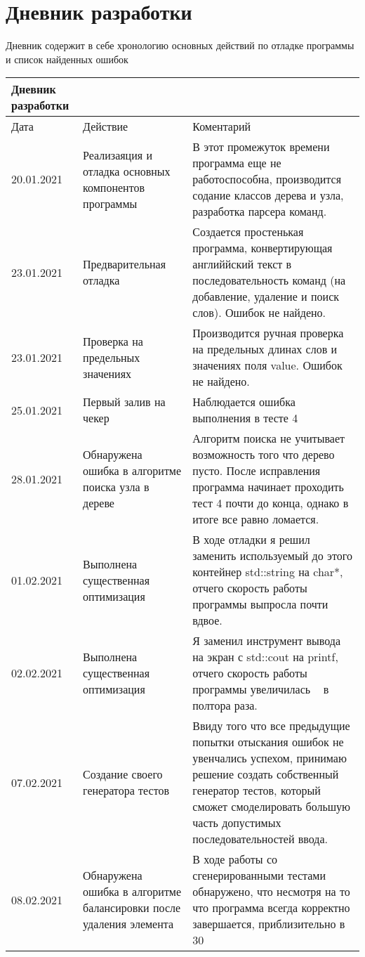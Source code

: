 \section{Дневник разработки}
Дневник содержит в себе хронологию основных действий по отладке программы и список найденных ошибок

\begin{longtable}{|p{5cm}|p{5cm}|p{5cm}|}
	\hline
	\rowcolor{lightgray}
	\multicolumn{3}{|c|} {Дневник разработки}\\\hline
	Дата&Действие&Коментарий\\\hline
	20.01.2021&Реализаяция и отладка основных компонентов программы&В этот промежуток времени программа еще не работоспособна, производится содание классов дерева и узла, разработка парсера команд.\\\hline
	23.01.2021&Предварительная отладка&Создается простенькая программа, конвертирующая английйский текст в последовательность команд (на добавление, удаление и поиск слов). Ошибок не найдено.\\\hline
	23.01.2021&Проверка на предельных значениях&Производится ручная проверка на предельных длинах слов и значениях поля value. Ошибок не найдено.\\\hline
	25.01.2021&Первый залив на чекер&Наблюдается ошибка выполнения в тесте 4\\\hline
	28.01.2021&Обнаружена ошибка в алгоритме поиска узла в дереве&Алгоритм поиска не учитывает возможность того что дерево пусто. После исправления программа начинает проходить тест 4 почти до конца, 
	однако в итоге все равно ломается.\\\hline
	01.02.2021&Выполнена существенная оптимизация&В ходе отладки я решил заменить используемый до этого контейнер std::string на char*, отчего скорость работы программы выпросла почти вдвое.\\\hline
	02.02.2021&Выполнена существенная оптимизация&Я заменил инструмент вывода на экран с std::cout на printf, отчего скорость работы программы увеличилась ~ в полтора раза.\\\hline
	07.02.2021&Создание своего генератора тестов&Ввиду того что все предыдущие попытки отыскания ошибок не увенчались успехом, принимаю решение создать собственный генератор тестов, который сможет смоделировать большую часть допустимых последовательностей ввода.\\\hline
	08.02.2021&Обнаружена ошибка в алгоритме балансировки после удаления элемента&В ходе работы со сгенерированными тестами обнаружено, что несмотря на то что программа всегда корректно завершается, приблизительно в 30%

\end{longtable}
